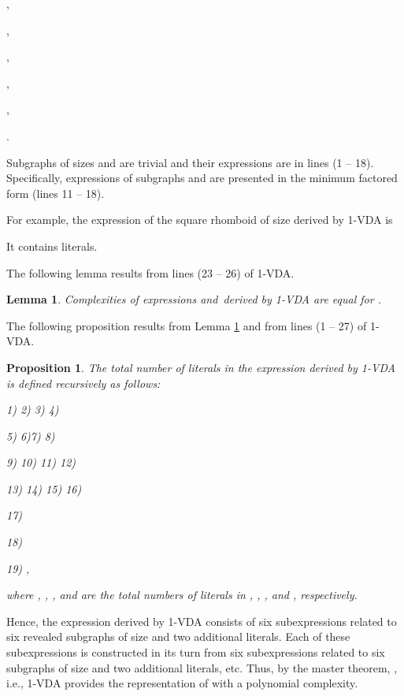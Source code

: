 \documentclass[11pt]{article}\usepackage{amsmath}
\newtheorem{lemma}[theorem]{Lemma}
\newtheorem{proposition}[theorem]{Proposition}
\begin{document}
\quad

 \label{mfda_23}, 

\quad

 ,


\quad

 ,


\quad

 \label{mfda_26}, 

\quad

 \label{mfda_27},


\quad.

Subgraphs of sizes  and  are trivial and their expressions are in lines
(1 -- 18). Specifically, expressions of subgraphs  and
 are presented in the minimum factored form (lines
11 -- 18).

For example, the expression of the square rhomboid of size  derived by
1-VDA is

It contains  literals.

The following lemma results from lines (23 -- 26) of 1-VDA.

\begin{lemma}
\label{lem_mfda}Complexities of expressions  and\linebreak\  derived by 1-VDA are
equal for .
\end{lemma}

The following proposition results from Lemma \ref{lem_mfda} and from lines (1
-- 27) of 1-VDA.

\begin{proposition}
\label{th_mfda}The total number of literals  in the expression
 derived by 1-VDA is defined recursively as follows:

1) 2) 3) 4) 

5)  6)7) 8)


9) 10)  11) 12) 

13) 14)  15) 16) 

17) 

18) 

19) ,\smallskip

where , , , and  are the total numbers of
literals in , , , and
, respectively.
\end{proposition}

Hence, the expression  derived by 1-VDA consists of six
subexpressions related to six revealed subgraphs of size 
 and two additional literals. Each of these subexpressions is
constructed in its turn from six subexpressions related to six subgraphs of
size   and two additional literals, etc.
Thus, by the master theorem, , i.e.,
1-VDA provides the representation of  with a polynomial complexity.
\end{document}
